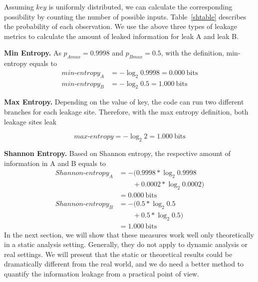 Assuming $\mathit{key}$ is uniformly distributed, we can calculate the corresponding
possibility by counting the number of possible inputs. Table~\ref{shtable}
describes the probability of each observation. We use the above three types of 
leakage metrics to calculate the amount of leaked information for leak A and leak B.

\vspace{3pt}
\textbf{Min Entropy.}
As $p_{A\mathit{max}} = 0.9998$ and $p_{B\mathit{max}} = 0.5$, 
with the definition, min-entropy equals to
\begin{align*}
    \mathit{min\text{-}entropy_A} & = -\log_2{0.9998} = 0.000\ \mathrm{bits} \\
    \mathit{min\text{-}entropy_B} & = -\log_2{0.5} = 1.000\ \mathrm{bits}
\end{align*}

\textbf{Max Entropy.}
Depending on the value of key, the code can run two different branches for each leakage site. 
Therefore, with the max entropy
definition, both leakage sites leak

\begin{displaymath}
    \mathit{max\text{-}entropy} = -\log_2{2} = 1.000\ \mathrm{bits}
\end{displaymath}

\textbf{Shannon Entropy.}
Based on Shannon entropy, the respective amount of information in A and B equals to
{\footnotesize
\begin{align*}
    \mathit{Shannon\text{-}entropy_A} & = -(0.9998*\log_{2}0.9998      \\
                                    & \qquad+ 0.0002*\log_{2}0.0002)  \\
                                    & = 0.000\ \mathrm{bits}         \\
    \mathit{Shannon\text{-}entropy_B} & = -(0.5*\log_{2}0.5      \\
                                    & \qquad+ 0.5*\log_{2}0.5)        \\
                                    & = 1.000\ \mathrm{bits}                             
\end{align*}
}
In the next section, we will show that these measures work well only
theoretically in a static analysis setting. 
Generally, they do not apply to dynamic analysis or real
settings. We will present that the static or theoretical results could be
dramatically different from the real world, and we do need a better method to
quantify the information leakage from a practical point of view.

